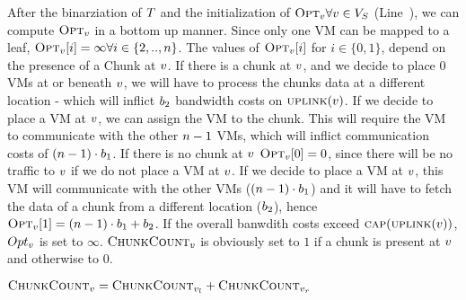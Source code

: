 After the binarziation of $T$ and the initialization of 
$\textsc{Opt}_{v} \forall v \in V_S$ 
(Line~), we can compute $\textsc{Opt}_{v}$ in a bottom up 
manner. Since only one VM can be mapped to a leaf, $\textsc{Opt}_{v}[i] = 
\infty \forall i \in \{2,..,n\}$. The values of 
$\textsc{Opt}_{v}[i]$ for $i \in \{0,1\}$, depend on the presence of a Chunk 
at $v$. If there is a chunk at $v$, and we decide to 
place $0$ VMs at or beneath $v$, we will have to process the chunks 
data at a different location - which will inflict $b_2$ bandwidth costs 
on $\textsc{uplink}(v)$. If we decide to place a VM at $v$, 
we can assign the VM to the chunk. This will require the VM to communicate with 
the other $n -1$ VMs, which will inflict communication costs of $(n -1) 
\cdot b_1$. If there is no chunk at $v$ 
$\textsc{Opt}_{v}[0] = 0$, since there will be no traffic to 
$v$ if we do not place a VM at $v$. If we decide to 
place a VM at $v$, this VM will communicate with the other VMs 
($(n -1) \cdot b_1$) and it will have to fetch the data of a chunk from 
a different location ($b_2$), hence $\textsc{Opt}_{v}[1] = (n -1 
)\cdot b_1  + b_2$. If the overall banwdith costs exceed 
$\textsc{cap}(\textsc{uplink}(v))$, $Opt_{v}$ is set to $\infty$.
$\textsc{ChunkCount}_{v}$ is obviously set to 
$1$ if a 
chunk is present at $v$ and otherwise to $0$.

\newcommand{\SumIndex}{\ensuremath{n}}
\begin{algorithm}[tbhp]
\DontPrintSemicolon %
\SetAlgoNoEnd
{}
$\textsc{ChunkCount}_{v} = \textsc{ChunkCount}_{v_l} + 
\textsc{ChunkCount}_{v_r}$\;
\For{$\SumIndex \in \{0,\dots,\Vms\}$}{
  \For{$i \in \{0,\dots,\SumIndex\}$}{
      \If{$\Opt_\SubstrateNode[\SumIndex] > \Opt_{\SubstrateNode_l}[i] + 
\Opt_{\SubstrateNode_r}[\SumIndex - i]$}{
	$\Opt_\SubstrateNode[\SumIndex] \gets \Opt_{\SubstrateNode_l}[i] + 
\Opt_{\SubstrateNode_r}[\SumIndex - i]$\;
    }
  }
  
 $bw \gets (\Vms - 
\SumIndex) \cdot \SumIndex \cdot \CostCom +   |i - 
\ChunkCount_\SubstrateNode| \cdot \CostTrans$\; 
  \eIf{$bw \leq \Capacity(\Uplink(v))$}{
    $\Opt_\SubstrateNode[\SumIndex] \gets \Opt_\SubstrateNode[\SumIndex] + bw$\;
  }{
    $\Opt_\SubstrateNode[\SumIndex] \gets \infty$\;
  }
}
%
\caption{$aggregate(\SubstrateNode \in \SubstrateNodes)$}
\label{algo:dynAggregation}
\end{algorithm}

